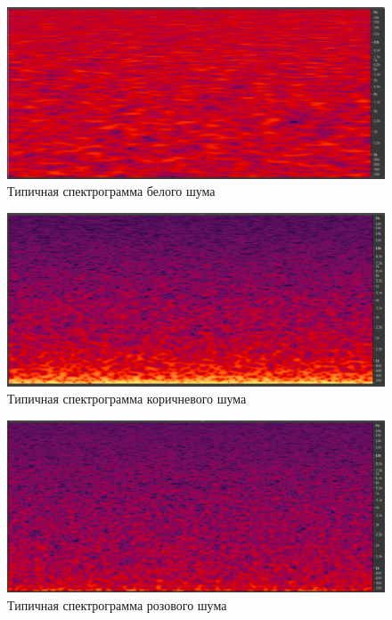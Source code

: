 \documentclass[oneside, final, 14pt]{extreport}
\begin{document}
\begin{figure}[h]
\centering
\includegraphics[scale=0.5]{pic-noise-01}
\caption{Типичная спектрограмма белого шума}
\label{pic-noise-01}
\end{figure}

\begin{figure}[h]
\centering
\includegraphics[scale=0.5]{pic-noise-03}
\caption{Типичная спектрограмма коричневого шума}
\label{pic-noise-03}
\end{figure}

\begin{figure}[h]
\centering
\includegraphics[scale=0.5]{pic-noise-02}
\caption{Типичная спектрограмма розового шума}
\label{pic-noise-02}
\end{figure}
\end{document}
